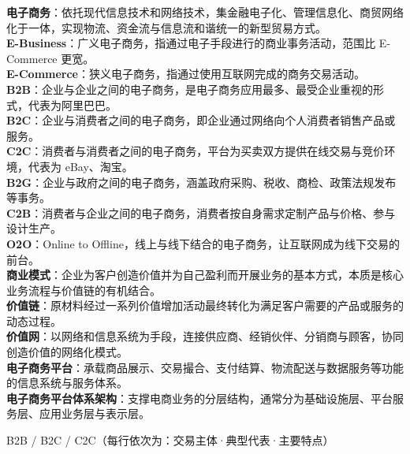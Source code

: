 \documentclass[a4paper,11pt]{article}
\begin{document}
\begin{keyterms}
\textbf{电子商务}：依托现代信息技术和网络技术，集金融电子化、管理信息化、商贸网络化于一体，实现物流、资金流与信息流和谐统一的新型贸易方式。\\
\textbf{E-Business}：广义电子商务，指通过电子手段进行的商业事务活动，范围比 E-Commerce 更宽。\\
\textbf{E-Commerce}：狭义电子商务，指通过使用互联网完成的商务交易活动。\\
\textbf{B2B}：企业与企业之间的电子商务，是电子商务应用最多、最受企业重视的形式，代表为阿里巴巴。\\
\textbf{B2C}：企业与消费者之间的电子商务，即企业通过网络向个人消费者销售产品或服务。\\
\textbf{C2C}：消费者与消费者之间的电子商务，平台为买卖双方提供在线交易与竞价环境，代表为 eBay、淘宝。\\
\textbf{B2G}：企业与政府之间的电子商务，涵盖政府采购、税收、商检、政策法规发布等事务。\\
\textbf{C2B}：消费者与企业之间的电子商务，消费者按自身需求定制产品与价格、参与设计生产。\\
\textbf{O2O}：Online to Offline，线上与线下结合的电子商务，让互联网成为线下交易的前台。\\
\textbf{商业模式}：企业为客户创造价值并为自己盈利而开展业务的基本方式，本质是核心业务流程与价值链的有机结合。\\
\textbf{价值链}：原材料经过一系列价值增加活动最终转化为满足客户需要的产品或服务的动态过程。\\
\textbf{价值网}：以网络和信息系统为手段，连接供应商、经销伙伴、分销商与顾客，协同创造价值的网络化模式。\\
\textbf{电子商务平台}：承载商品展示、交易撮合、支付结算、物流配送与数据服务等功能的信息系统与服务体系。\\
\textbf{电子商务平台体系架构}：支撑电商业务的分层结构，通常分为基础设施层、平台服务层、应用业务层与表示层。
\end{keyterms}

\newpage
\begin{contrast}{B2B / B2C / C2C（每行依次为：交易主体·典型代表·主要特点）}
\end{contrast}
\end{document}
